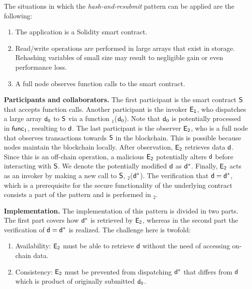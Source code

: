 The situations in which the \emph{hash-and-resubmit} pattern can be applied are
the following:
\begin{enumerate}
    \item The application is a Solidity smart contract.
    \item Read/write operations are performed in large arrays that exist in
        storage. Rehashing variables of small size may result to negligible
        gain or even performance loss.
    \item A full node observes function calls to the smart contract.
\end{enumerate}

\noindent \textbf{Participants and collaborators.} The first participant is the
smart contract $\mathsf{S}$ that accepts function calls. Another participant is
the invoker $\mathsf{E_{1}}$, who dispatches a large array $\mathsf{d}_0$ to $\mathsf{S}$
via a function \texttt{\proc$_1$}($\mathsf{d}_0$). Note that $\mathsf{d}_0$ is
potentially processed in $\textsf{func}_1$, resulting to $\mathsf{d}$. The last participant
is the observer $\mathsf{E_{2}}$, who is a full node that observes transactions
towards $\mathsf{S}$ in the blockchain. This is possible because nodes maintain
the blockchain locally. After observation, $\mathsf{E_{2}}$ retrieves data $\mathsf{d}$.
Since this is an off-chain operation, a malicious $\mathsf{E_{2}}$ potentially
alters $\mathsf{d}$ before interacting with $\mathsf{S}$. We denote the
potentially modified $\mathsf{d}$ as $\mathsf{d^*}$. Finally, $\mathsf{E_{2}}$ acts as an
invoker by making a new call to $\mathsf{S}$, \texttt{\proc$_2$}($\mathsf{d^*}$). The
verification that $\mathsf{d} = \mathsf{d^*}$, which is a prerequisite for the secure
functionality of the underlying contract consists a part of the pattern and is
performed in \texttt{\proc$_2$}.

\noindent \textbf{Implementation.} The implementation of this pattern is
divided in two parts. The first part covers how $\mathsf{d^*}$ is retrieved by
$\mathsf{E_{2}}$, whereas in the second part the verification of $\mathsf{d}=\mathsf{d^*}$ is
realized. The challenge here is twofold:

\begin{enumerate}

    \item Availability: $\mathsf{E_{2}}$ must be able to retrieve $\mathsf{d}$ without
        the need of accessing on-chain data.

    \item Consistency: $\mathsf{E_{2}}$ must be prevented from dispatching $\mathsf{d^*}$
        that differs from $\mathsf{d}$ which is product of originally submitted
        $\mathsf{d}_0$.

\end{enumerate}

